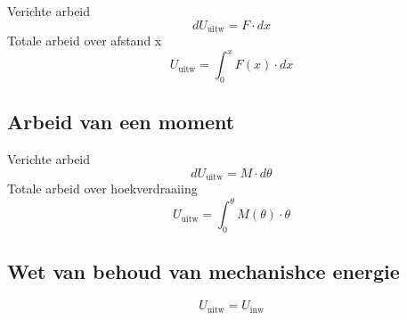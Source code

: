             Verichte arbeid
            \begin{equation}
                dU_{\text{uitw}} = F\cdot dx
            \end{equation}
            Totale arbeid over afstand x
            \begin{equation}
                U_{\text{uitw}} = \int^x_0F(x)\cdot dx
            \end{equation}

        \subsection{Arbeid van een moment}

            Verichte arbeid
            \begin{equation}
                dU_{\text{uitw}}=M\cdot d\theta
            \end{equation}
            Totale arbeid over hoekverdraaiing
            \begin{equation}
                U_{\text{uitw}} = \int^{\theta}_0M(\theta)\cdot\theta
            \end{equation}

        \subsection{Wet van behoud van mechanishce energie}

            \begin{equation}
                U_{\text{uitw}} = U_{\text{inw}}
            \end{equation}
                


                
        


